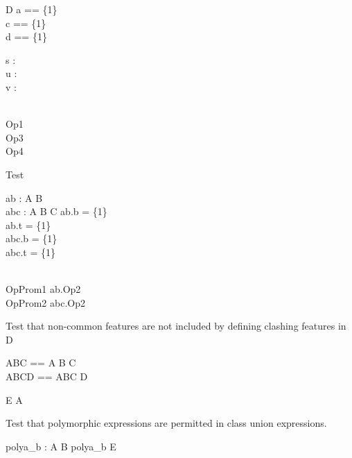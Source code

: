 \begin{class}{D}
  a == \{1\}\\
  c == \{1\}\\
  d == \{1\}\\
  \begin{state}
    s : \power\nat\\
    u : \power\nat\\
    v : \power\nat
  \end{state}\\
  Op1 \\
  Op3 \\
  Op4 
\end{class}

\begin{class}{Test}
  \begin{state}
    ab : A \classuni B\\
    abc : A \classuni B \classuni C
  \where
    ab.b = \{1\}\\
    ab.t = \{1\}\\
    abc.b = \{1\}\\
    abc.t = \{1\}\\
  \end{state}\\
  OpProm1 \sdef ab.Op2\\
  OpProm2 \sdef abc.Op2
\end{class}

Test that non-common features are not included by defining clashing
features in D
\begin{zed}
  ABC == A \classuni B \classuni C\\
  ABCD == ABC \classuni D
\end{zed}

\begin{class}{E}
  A\\
\end{class}

Test that polymorphic expressions are permitted in class union expressions.

\begin{axdef}
  polya\_b : \poly A \classuni B
\where
  polya\_b \in E
\end{axdef}

